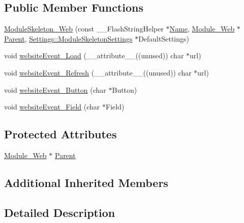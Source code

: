 \subsection*{Public Member Functions}
\begin{DoxyCompactItemize}
\item 
\hyperlink{class_module_skeleton___web_aec8ecee521cba264f403e7ff08d178d8}{Module\+Skeleton\+\_\+\+Web} (const \+\_\+\+\_\+\+Flash\+String\+Helper $\ast$\hyperlink{class_common_aeea91a726dbe988e515057b32ba0726f}{Name}, \hyperlink{class_module___web}{Module\+\_\+\+Web} $\ast$\hyperlink{class_module_skeleton___web_a1d1f4bc02a96a7e25defd87ef2c06df8}{Parent}, \hyperlink{struct_settings_1_1_module_skeleton_settings}{Settings\+::\+Module\+Skeleton\+Settings} $\ast$Default\+Settings)
\item 
void \hyperlink{class_module_skeleton___web_a391e4cad5fa897f0b57e3992c68eac14}{website\+Event\+\_\+\+Load} (\+\_\+\+\_\+attribute\+\_\+\+\_\+((unused)) char $\ast$url)
\item 
void \hyperlink{class_module_skeleton___web_a4fbb767613efc275f91eac8e550f1a86}{website\+Event\+\_\+\+Refresh} (\+\_\+\+\_\+attribute\+\_\+\+\_\+((unused)) char $\ast$url)
\item 
void \hyperlink{class_module_skeleton___web_a2946ad7edbf3aa43aa462a0c5350cb84}{website\+Event\+\_\+\+Button} (char $\ast$Button)
\item 
void \hyperlink{class_module_skeleton___web_aeff57d699bdcbab91538f8073cdbf9b0}{website\+Event\+\_\+\+Field} (char $\ast$Field)
\end{DoxyCompactItemize}
\subsection*{Protected Attributes}
\begin{DoxyCompactItemize}
\item 
\hyperlink{class_module___web}{Module\+\_\+\+Web} $\ast$ \hyperlink{class_module_skeleton___web_a1d1f4bc02a96a7e25defd87ef2c06df8}{Parent}
\end{DoxyCompactItemize}
\subsection*{Additional Inherited Members}


\subsection{Detailed Description}


